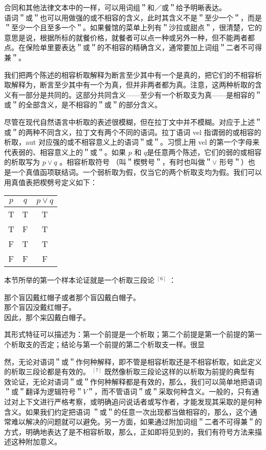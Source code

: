 合同和其他法律文本中的一样，可以用词组＂和／或＂给予明晰表达。\\
语词＂或＂也可以用做强的或不相容的含义，此时其含义不是＂至少一个＂，而是＂至少一个且至多一个＂。如果餐馆的菜单上列有＂沙拉或甜点＂，很清楚，它的意思是说，根据所标的就餐价格，就餐者可以点一种或另外一种，但不能两者都点。在保险单里要表达＂或＂的不相容的精确含义，通常要加上词组＂二者不可得兼＂。

我们把两个陈述的相容析取解释为断言至少其中有一个是真的，把它们的不相容析取解释为，断言至少其中有一个为真，但并非两者都为真。注意，这两种析取的含义有一部分是共同的。这部分共同含义——至少有一个析取支为真——是相容的＂或＂的全部含义，是不相容的＂或＂的部分含义。

尽管在现代自然语言中析取的表述很模糊，但在拉丁文中并不模糊。对应于上述＂或＂的两种不同含义，拉丁文有两个不同的语词。拉丁语词 vel 指谓弱的或相容的析取，aut 对应强的或不相容意义上的语词＂或＂。习惯上用 vel 的第一个字母来代表弱的、相容意义上的＂或＂。如果 $p$ 和 $q$是任意两个陈述，它们的弱的或相容的析取写为 $p \vee q$ 。相容析取符号 （叫＂楔劈号＂，有时也叫做＂$\vee$ 形号＂）也是一个真值函项联结词。一个弱析取为假，仅当它的两个析取支均为假。我们可以用真值表把楔劈号定义如下：

\begin{center}
\begin{tabular}{|ccc|}
\hline
$p$ & $q$ & $p \vee q$ \\
\hline
T & T & T \\
T & F & T \\
F & T & T \\
F & F & F \\
\hline
\end{tabular}
\end{center}

本节所举的第一个样本论证就是一个析取三段论 ${ }^{[6]}$ ：

那个盲囚戴红帽子或者那个盲囚戴白帽子。\\
那个盲囚没戴红帽子。\\
因此，那个杗囚戴白帽子。

其形式特征可以描述为：第一个前提是一个析取；第二个前提是第一个前提的第一个析取支的否定；结论与第一个前提的第二个析取支一样。很显

然，无论对语词＂或＂作何种解释，即不管是相容析取还是不相容析取，如此定义的析取三段论都是有效的。 ${ }^{[7]}$ 既然像析取三段论这样的以析取为前提的典型有效论证，无论对语词＂或＂作何种解释都是有效的，那么，我们可以简单地把语词＂或＂翻译为逻辑符号＂$V$＂，而不管语词＂或＂采取何种含义。一般的，只有通过对上下文进行严格考察，或明确追问说话者或写作者，才能发现其采取的是何种含义。如果我们约定把语词 ＂或＂的任意一次出现都当做相容的，那么，这个通常难以解决的问题就可以避免。另一方面，如果通过附加词组＂二者不可得兼＂的方式，明确地表达了是不相容析取，那么，正如即将见到的，我们有符号方法来描述这种附加意义。

